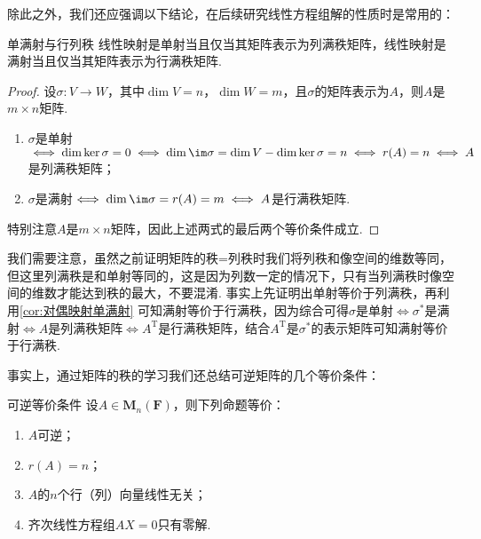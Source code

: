 除此之外，我们还应强调以下结论，在后续研究线性方程组解的性质时是常用的：
\begin{theorem}{}{单满射与行列秩}
    线性映射是单射当且仅当其矩阵表示为列满秩矩阵，线性映射是满射当且仅当其矩阵表示为行满秩矩阵.
\end{theorem}

\begin{proof}
    设$\sigma:V\to W$，其中$\dim V=n$，$\dim W=m$，且$\sigma$的矩阵表示为$A$，则$A$是$m\times n$矩阵.
    \begin{enumerate}
        \item $\sigma$是单射$\iff\dim\ker\sigma=0\iff \dim\im\sigma=\dim V-\dim\ker\sigma=n\iff r(A)=n\iff A$是列满秩矩阵；

        \item $\sigma$是满射$\iff\dim\im\sigma=r(A)=m\iff A$是行满秩矩阵.
    \end{enumerate}
    特别注意$A$是$m\times n$矩阵，因此上述两式的最后两个等价条件成立.
\end{proof}

我们需要注意，虽然之前证明矩阵的秩=列秩时我们将列秩和像空间的维数等同，但这里列满秩是和单射等同的，这是因为列数一定的情况下，只有当列满秩时像空间的维数才能达到秩的最大，不要混淆. 事实上先证明出单射等价于列满秩，再利用\autoref{cor:对偶映射单满射} 可知满射等价于行满秩，因为综合可得$\sigma$是单射$\iff\sigma^*$是满射$\iff A$是列满秩矩阵$\iff A^\mathrm{T}$是行满秩矩阵，结合$A^\mathrm{T}$是$\sigma^*$的表示矩阵可知满射等价于行满秩.

事实上，通过矩阵的秩的学习我们还总结可逆矩阵的几个等价条件：
\begin{theorem}{}{可逆等价条件}
    设$A \in \mathbf{M}_n(\mathbf{F})$，则下列命题等价：
    \begin{enumerate}[label=(\arabic*)]
        \item \label{item:11:可逆等价条件:1}
              $A$可逆；

        \item \label{item:11:可逆等价条件:2}
              $r(A)=n$；

        \item \label{item:11:可逆等价条件:3}
              $A$的$n$个行（列）向量线性无关；

        \item \label{item:11:可逆等价条件:4}
              齐次线性方程组$AX=0$只有零解.
    \end{enumerate}
\end{theorem}

